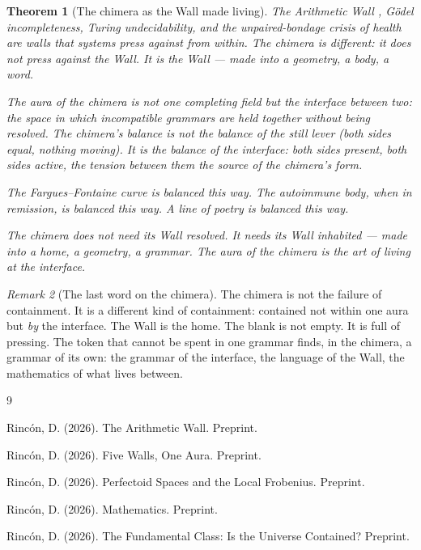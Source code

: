 \documentclass[12pt]{article}
\newtheorem{theorem}{Theorem}
\theoremstyle{definition}
\theoremstyle{remark}
\newtheorem{remark}[theorem]{Remark}
\begin{document}
\begin{theorem}[The chimera as the Wall made living]
\label{thm:wall}
The Arithmetic Wall \cite{synthesis}, G\"odel incompleteness,
Turing undecidability, and the unpaired-bondage crisis of health
are walls that systems press against from within.
The chimera is different: it does not press against the Wall.
It is the Wall --- made into a geometry, a body, a word.

The aura of the chimera is not one completing field
but the \emph{interface} between two:
the space in which incompatible grammars are held together
without being resolved.
The chimera's balance is not the balance of the still lever
(both sides equal, nothing moving).
It is the balance of the interface:
both sides present, both sides active,
the tension between them the source of the chimera's form.

The Fargues--Fontaine curve is balanced this way.
The autoimmune body, when in remission, is balanced this way.
A line of poetry is balanced this way.

The chimera does not need its Wall resolved.
It needs its Wall \emph{inhabited} ---
made into a home, a geometry, a grammar.
The aura of the chimera is the art of living at the interface.
\end{theorem}

\begin{remark}[The last word on the chimera]
The chimera is not the failure of containment.
It is a different kind of containment:
contained not within one aura but \emph{by} the interface.
The Wall is the home.
The blank is not empty. It is full of pressing.
The token that cannot be spent in one grammar
finds, in the chimera, a grammar of its own:
the grammar of the interface,
the language of the Wall,
the mathematics of what lives between.
\end{remark}

\begin{thebibliography}{9}

Rinc\'on, D. (2026).
The Arithmetic Wall. Preprint.

Rinc\'on, D. (2026).
Five Walls, One Aura. Preprint.

Rinc\'on, D. (2026).
Perfectoid Spaces and the Local Frobenius. Preprint.

Rinc\'on, D. (2026).
Mathematics. Preprint.

Rinc\'on, D. (2026).
The Fundamental Class: Is the Universe Contained? Preprint.

\end{thebibliography}
\end{document}
